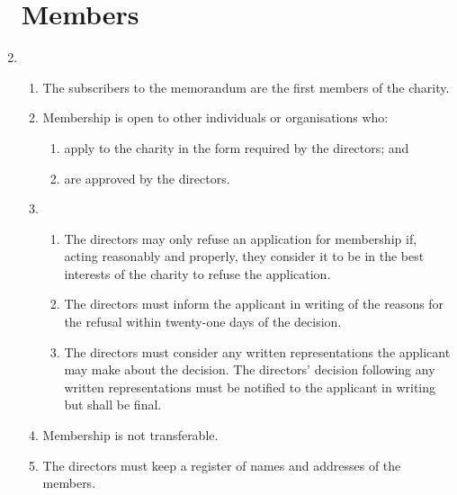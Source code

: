 \documentclass{article}
\begin{document}
\begin{enumerate}[label=\arabic*]
    \section{Members}
    \item \begin{enumerate}[label=(\arabic*)]
        \item The subscribers to the memorandum are the first members of
        the charity.
        \item Membership is open to other individuals or organisations who:
        \begin{enumerate}[label=(\alph*)]
            \item apply to the charity in the form required by the
            directors; and
            \item are approved by the directors.
        \end{enumerate}
        \item \begin{enumerate}[label=(\alph*)]
            \item The directors may only refuse an application for
            membership if, acting reasonably and properly, they
            consider it to be in the best interests of the charity to
            refuse the application.
            \item The directors must inform the applicant in writing of
            the reasons for the refusal within twenty-one days of
            the decision.
            \item The directors must consider any written representations
            the applicant may make about the decision. The directors’
            decision following any written representations must be
            notified to the applicant in writing but shall be final.
        \end{enumerate}
        \item Membership is not transferable.
        \item The directors must keep a register of names and addresses of
        the members.
    \end{enumerate}
    

\end{enumerate}
\end{document}

